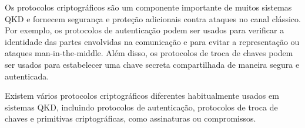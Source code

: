 Os protocolos criptográficos são um componente importante de muitos sistemas QKD e fornecem segurança e proteção adicionais contra ataques no canal clássico. Por exemplo, os protocolos de autenticação podem ser usados para verificar a identidade das partes envolvidas na comunicação e para evitar a representação ou ataques man-in-the-middle. Além disso, os protocolos de troca de chaves podem ser usados para estabelecer uma chave secreta compartilhada de maneira segura e autenticada.

Existem vários protocolos criptográficos diferentes habitualmente usados em sistemas QKD, incluindo protocolos de autenticação, protocolos de troca de chaves e primitivas criptográficas, como assinaturas ou compromissos.

\newpage
